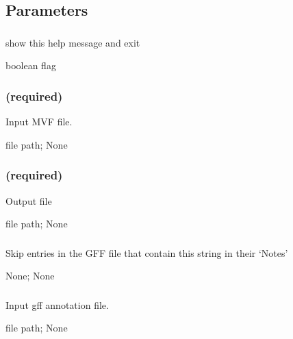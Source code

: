 \documentclass[letterpaper,11pt,english]{sphinxmanual}
\begin{document}
\subsection{Parameters}
\label{\detokenize{prog_desc:parameters}}

\subsubsection{}
\label{\detokenize{prog_desc:h-help}}
 show this help message and exit

 boolean flag


\subsubsection{ (required)}
\label{\detokenize{prog_desc:mvf-required}}
 Input MVF file.

 file path;  None


\subsubsection{ (required)}
\label{\detokenize{prog_desc:out-required}}
 Output file

 file path;  None


\subsubsection{}
\label{\detokenize{prog_desc:filter-annotation-filterannotation}}
 Skip entries in the GFF file that contain this string in their ‘Notes’

 None;  None


\subsubsection{}
\label{\detokenize{prog_desc:gff}}
 Input gff annotation file.

 file path;  None
\end{document}
